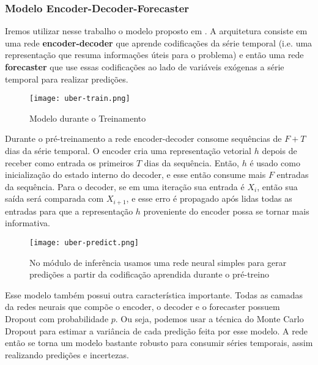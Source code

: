 \subsubsection{Modelo Encoder-Decoder-Forecaster}

Iremos utilizar nesse trabalho o modelo proposto em \citep{ubertime}. A
arquitetura consiste em uma rede \textbf{encoder-decoder} que aprende codificações da
série temporal (i.e. uma representação que resuma informações úteis para o
problema) e então uma rede \textbf{forecaster} que use essas codificações ao lado de
variáveis exógenas a série temporal para realizar predições.  \\ 



\begin{figure}[H]
\centering
\texttt{[image: uber-train.png]}
\caption{Modelo durante o Treinamento \citep{ubertime}}
\label{img:uber1}
\end{figure}


Durante o pré-treinamento a rede encoder-decoder consome sequências de $F + T$ dias
da série temporal. O encoder cria uma representação vetorial $h$ depois de
receber como entrada os primeiros $T$ dias da sequência. Então, $h$ é usado como
inicialização do estado interno do decoder, e esse então consume mais $F$
entradas da sequência. Para o decoder, se em uma iteração sua entrada é $X_i$,
então sua saída será comparada com $X_{i+1}$, e esse erro é propagado após lidas
todas as entradas para que a representação $h$ proveniente do encoder possa se
tornar mais informativa. \\


\begin{figure}[H]
  \centering
  \texttt{[image: uber-predict.png]}
  \caption{No módulo de inferência usamos uma rede neural simples para gerar
    predições a partir da codificação aprendida durante o pré-treino \citep{ubertime}}
  \label{img:uber2}
\end{figure}




Esse modelo também possui outra característica importante. Todas as camadas da
redes neurais que compõe o encoder, o decoder e o forecaster possuem
Dropout com probabilidade $p$. Ou seja, podemos usar a técnica do Monte
Carlo Dropout para estimar a variância de cada predição feita por esse modelo. A
rede então se torna um modelo bastante robusto para consumir séries temporais,
assim realizando predições e incertezas.\\


